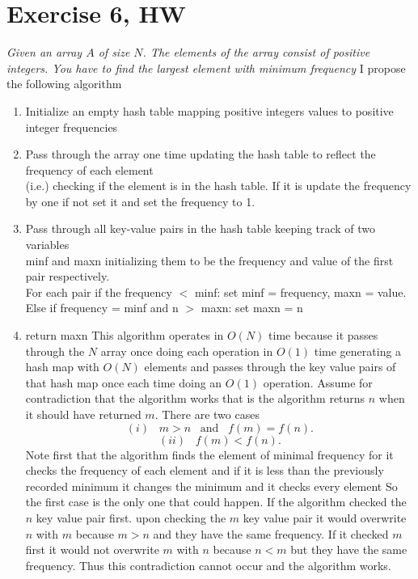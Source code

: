 \documentclass{amsart}
\begin{document}
\section{Exercise 6, HW}
\emph{
    Given an array $A$ of size $N$. The elements of the array consist of positive integers. You have
    to find the largest element with minimum frequency
}
I propose the following algorithm
\begin{enumerate}
    \item Initialize an empty hash table mapping positive integers values to positive integer frequencies
    \item Pass through the array one time updating the hash table to reflect the frequency of each element\\
        (i.e.) checking if the element is in the hash table. If it is update the frequency by one if not set it and set the frequency to 1.
    \item Pass through all key-value pairs in the hash table keeping track of two variables\\
        minf and maxn initializing them to be the frequency and value of the first pair respectively.\\
        For each pair if the frequency $<$ minf: set minf = frequency, maxn = value.
        Else if frequency = minf and n $>$ maxn: set maxn = n
    \item return maxn
    This algorithm operates in $O(N)$ time because it passes through the $N$ array once doing each operation in $O(1)$ time generating
    a hash map with $O(N)$ elements and passes through the key value pairs of that hash map once each time doing an $O(1)$ operation.
    Assume for contradiction that the algorithm works that is the algorithm returns $n$ when it should have returned $m$.
    There are two cases\\
    \[
        (i) \;\;\; m > n \;\;\; \text{and} \;\;\; f(m) = f(n)
    .\] 
    \[
        (ii) \;\;\;  f(m) < f(n)
    .\] 
    Note first that the algorithm finds the element of minimal frequency for it checks the frequency
    of each element and if it is less than the previously recorded minimum it changes the minimum and it checks every element
    So the first case is the only one that could happen. If the algorithm checked the $n$ key value pair first. upon checking the $m$ key
    value pair it would overwrite $n$ with $m$ because $m > n$ and they have the same frequency. If it checked $m$ first it would not overwrite
    $m$ with $n$ because $n < m$ but they have the same frequency. Thus this contradiction cannot occur and the algorithm works.
\end{enumerate}
\end{document}
